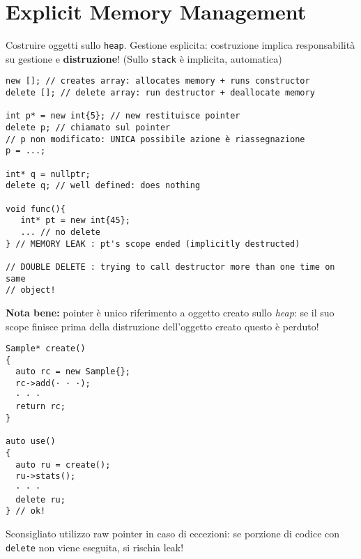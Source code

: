 \documentclass[10pt, oneside]{Book}
\begin{document}
\chapter{Explicit Memory Management}
Costruire oggetti sullo \texttt{heap}. Gestione esplicita: costruzione implica responsabilità su gestione e \textbf{distruzione}! (Sullo \texttt{stack} è implicita, automatica)
\begin{verbatim}
new []; // creates array: allocates memory + runs constructor
delete []; // delete array: run destructor + deallocate memory

int p* = new int{5}; // new restituisce pointer
delete p; // chiamato sul pointer
// p non modificato: UNICA possibile azione è riassegnazione
p = ...;

int* q = nullptr;
delete q; // well defined: does nothing

void func(){
   int* pt = new int{45};
   ... // no delete
} // MEMORY LEAK : pt's scope ended (implicitly destructed)

// DOUBLE DELETE : trying to call destructor more than one time on same
// object! 
\end{verbatim}
\textbf{Nota bene:} pointer è unico riferimento a oggetto creato sullo \textit{heap}: se il suo scope finisce prima della distruzione dell'oggetto creato questo è perduto!
\begin{verbatim}
Sample* create()
{
  auto rc = new Sample{};
  rc->add(· · ·);
  · · ·
  return rc;
}

auto use()
{
  auto ru = create();
  ru->stats();
  · · ·
  delete ru;
} // ok!
\end{verbatim}
Sconsigliato utilizzo raw pointer in caso di eccezioni: se porzione di codice con \texttt{delete} non viene eseguita, si rischia leak!
\end{document}
